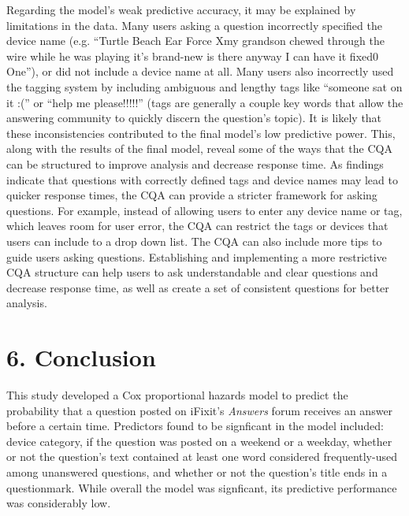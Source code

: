 \documentclass{article}
\begin{document}
Regarding the model's weak predictive accuracy, it may be explained by limitations in the data. Many users asking a question incorrectly specified the device name (e.g. ``Turtle Beach Ear Force Xmy grandson chewed through the wire while he was playing it's brand-new is there anyway I can have it fixed0 One''), or did not include a device name at all. Many users also incorrectly used the tagging system by including ambiguous and lengthy tags like ``someone sat on it :('' or ``help me please!!!!!'' (tags are generally a couple key words that allow the answering community to quickly discern the question's topic). It is likely that these inconsistencies contributed to the final model's low predictive power. This, along with the results of the final model, reveal some of the ways that the CQA can be structured to improve analysis and decrease response time. As findings indicate that questions with correctly defined tags and device names may lead to quicker response times, the CQA can provide a stricter framework for asking questions. For example, instead of allowing users to enter any device name or tag, which leaves room for user error, the CQA can restrict the tags or devices that users can include to a drop down list. The CQA can also include more tips to guide users asking questions. Establishing and implementing a more restrictive CQA structure can help users to ask understandable and clear questions and decrease response time, as well as create a set of consistent questions for better analysis. 


\section*{6. Conclusion}

This study developed a Cox proportional hazards model to predict the probability that a question posted on iFixit's \textit{Answers} forum receives an answer before a certain time. Predictors found to be signficant in the model included: device category, if the question was posted on a weekend or a weekday, whether or not the question's text contained at least one word considered frequently-used among unanswered questions, and whether or not the question's title ends in a questionmark. While overall the model was signficant, its predictive performance was considerably low. 
\end{document}
